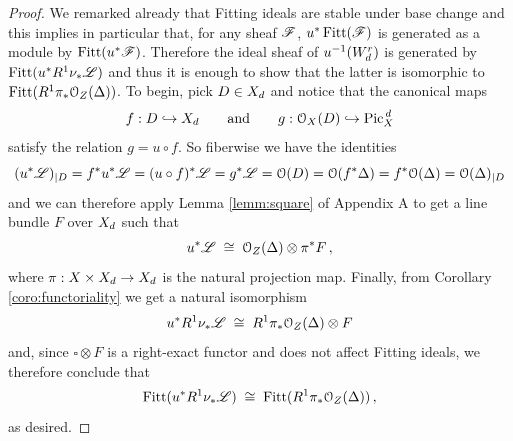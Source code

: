 	\begin{proof}
		We remarked already that Fitting ideals are stable under base change and this implies in particular that, for any sheaf $\mathscr{F}$, $u^*\operatorname{Fitt}(\mathscr{F})$ is generated as a module by $\operatorname{Fitt}(u^*\mathscr{F})$. Therefore the ideal sheaf of $u^{-1}(W_d^r)$ is generated by $\operatorname{Fitt}(u^* R^1\nu_{*}\mathscr{L})$ and thus it is enough to show that the latter is isomorphic to $\operatorname{Fitt}(R^1\pi_* \mathcal{O}_Z(\Delta))$. To begin, pick $D\in X_d$ and notice that the canonical maps
		$$ f: D \hookrightarrow X_d \qquad \text{and} \qquad g: \mathcal{O}_X(D) \hookrightarrow \operatorname{Pic}^{\,d}_X $$
		satisfy the relation $g = u\circ f$. So fiberwise we have the identities
		$$ (u^* \mathscr{L})_{\mid D} = f^* u^* \mathscr{L} = (u\circ f)^* \mathscr{L} = g^* \mathscr{L} = \mathcal{O}(D) = \mathcal{O}(f^* \Delta) = f^*\mathcal{O}(\Delta) = \mathcal{O}(\Delta)_{\mid D} $$
		and we can therefore apply Lemma \ref{lemm:square} of Appendix A to get a line bundle $F$ over $X_d$ such that
		$$ u^* \mathscr{L} \;\cong\; \mathcal{O}_Z(\Delta) \otimes \pi^* F \,, $$
		where $\pi: X\times X_d \to X_d$ is the natural projection map. Finally, from Corollary \ref{coro:functoriality} we get a natural isomorphism
		$$ u^*  R^1\nu_{*}\mathscr{L} \;\cong\; R^1\pi_*\mathcal{O}_Z(\Delta)\otimes F $$
		and, since $\square\otimes F$ is a right-exact functor and does not affect Fitting ideals, we therefore conclude that
		$$ \operatorname{Fitt}(u^* R^1\nu_{*}\mathscr{L}) 
		\;\cong\; 
		\operatorname{Fitt}(R^1\pi_*\mathcal{O}_Z(\Delta))\,, $$
		as desired.
	\end{proof}


